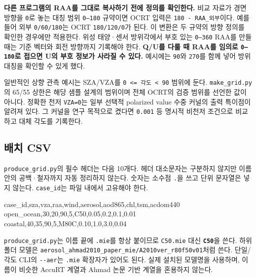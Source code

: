 \textbf{다른 프로그램의 RAA를 그대로 복사하기 전에 정의를 확인한다.} 비교 자료가 경면 방향을 \texttt{0\textdegree{}}로 놓는 대칭 범위 \texttt{0--180\textdegree{}} 규약이면 OCRT 입력은 \texttt{180\textdegree{} - RAA\_\allowbreak{}외부}이다. 예를 들어 외부 \texttt{0/\allowbreak{}60/\allowbreak{}180\textdegree{}}는 OCRT \texttt{180/\allowbreak{}120/\allowbreak{}0\textdegree{}}가 된다. 이 변환은 두 규약의 방향 정의를 확인한 경우에만 적용한다. 위성 태양·센서 방위각에서 부호 있는 \texttt{0--360\textdegree{}} RAA를 만들 때는 기준 벡터와 회전 방향까지 기록해야 한다. \textbf{Q/U를 다룰 때 RAA를 임의로 \texttt{0--180\textdegree{}}로 접으면 U의 부호 정보가 사라질 수 있다.} 예시에는 \texttt{90\textdegree{}}와 \texttt{270\textdegree{}}를 함께 넣어 방위 대칭을 확인할 수 있게 했다.

일반적인 상향 관측 예시는 SZA/VZA를 \texttt{0 <=\allowbreak{} 각도 < 90\textdegree{}} 범위에 둔다. \texttt{make\_\allowbreak{}grid.\allowbreak{}py}의 65\textdegree{}/55\textdegree{} 상한은 해당 샘플 설계의 범위이며 전체 OCRT의 검증 범위를 선언한 값이 아니다. 정확한 천저 \texttt{VZA=\allowbreak{}0\textdegree{}}는 일부 선택적 polarized value 수중 커널의 출력 특이점이 알려져 있다. 그 커널을 연구 목적으로 켰다면 \texttt{0.\allowbreak{}001\textdegree{}} 등 명시적 비천저 조건으로 비교하고 대체 각도를 기록한다.

\subsection{배치 CSV}
\label{sec:auto:06_python_batch:3.1}
\texttt{produce\_\allowbreak{}grid.\allowbreak{}py}의 필수 헤더는 다음 10개다. 헤더 대소문자는 구분하지 않지만 이름 안의 공백·철자까지 자동 정리하지 않는다. 숫자는 소수점 \texttt{.\allowbreak{}}을 쓰고 단위 문자열은 넣지 않는다. \texttt{case\_\allowbreak{}id}는 파일 내에서 고유해야 한다.


\begin{ManualCode}
case_id,sza,vza,raa,wind,aerosol,aod865,chl,tsm,acdom440
open_ocean,30,20,90,5,C50,0.05,0.2,0.1,0.01
coastal,40,35,90,5,M80C,0.10,1.0,3.0,0.04
\end{ManualCode}

\texttt{produce\_\allowbreak{}grid.\allowbreak{}py}는 이름 끝에 \texttt{.\allowbreak{}mie}를 항상 붙이므로 \texttt{C50.\allowbreak{}mie} 대신 \textbf{\texttt{C50}}을 쓴다. 하위 폴더 모델은 \texttt{aerosol\_\allowbreak{}ahmad2010\_\allowbreak{}paper\_\allowbreak{}mie/\allowbreak{}A2010ver\_\allowbreak{}r80f50v01}처럼 쓴다. 단일/각도 CLI의 \texttt{-\allowbreak{}-\allowbreak{}aer}는 \texttt{.\allowbreak{}mie} 확장자가 있어도 된다. 실제 설치된 모델명을 사용하며, 이름이 비슷한 AccuRT 계열과 Ahmad 논문 기반 계열을 혼용하지 않는다.

